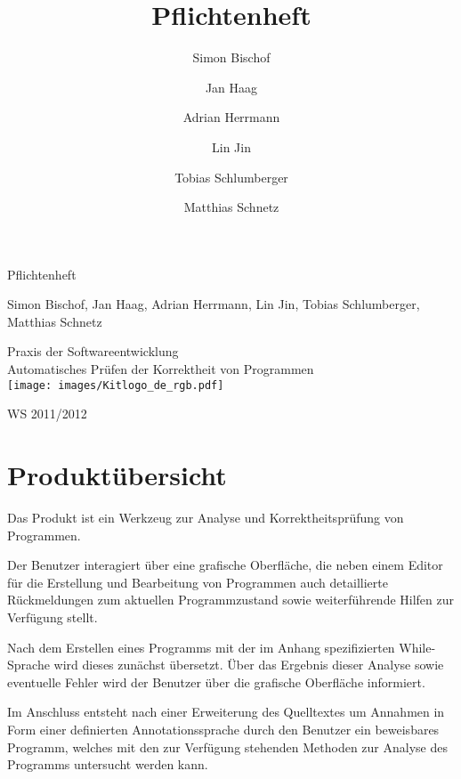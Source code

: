 \documentclass[a4paper,10pt]{article}
\title{Pflichtenheft}
\author{Simon Bischof \and Jan Haag \and Adrian Herrmann \and Lin Jin \and Tobias Schlumberger \and Matthias Schnetz}
\begin{document}
\vspace*{4cm}
\begin{center}
\begin {huge}
Pflichtenheft\\
\end{huge}
Simon Bischof, Jan Haag, Adrian Herrmann, Lin Jin, Tobias Schlumberger, Matthias Schnetz\\
\vspace{3cm}
\begin{huge}
Praxis der Softwareentwicklung \\
Automatisches Pr\"{u}fen der Korrektheit von Programmen\\
\texttt{[image: images/Kitlogo\_de\_rgb.pdf]}\\[0.5cm]
\end{huge}
\begin{huge}
WS 2011/2012
\end{huge}
\end{center}

\newpage
\tableofcontents
\newpage

\section{Produkt\"{u}bersicht}

Das Produkt ist ein Werkzeug zur Analyse und Korrektheitspr\"{u}fung von Programmen.

Der Benutzer interagiert \"{u}ber eine grafische Oberfl\"{a}che, die neben einem Editor f\"{u}r die Erstellung und Bearbeitung von Programmen auch detaillierte R\"{u}ckmeldungen zum aktuellen Programmzustand sowie weiterf\"{u}hrende Hilfen zur Verf\"{u}gung stellt.

Nach dem Erstellen eines Programms mit der im Anhang spezifizierten While-Sprache wird dieses zun\"{a}chst \"{u}bersetzt. \"{U}ber das Ergebnis dieser Analyse sowie eventuelle Fehler wird der Benutzer \"{u}ber die grafische Oberfl\"{a}che informiert.

Im Anschluss entsteht nach einer Erweiterung des Quelltextes um Annahmen in Form einer definierten Annotationssprache durch den Benutzer ein beweisbares Programm, welches mit den zur Verf\"{u}gung stehenden Methoden zur Analyse des Programms untersucht werden kann.
\end{document}
